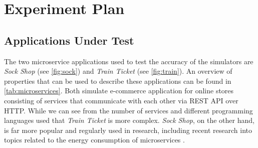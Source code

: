 \section{Experiment Plan}
\subsection{Applications Under Test} \label{sec:apps}
The two microservice applications used to test the accuracy of the simulators are \textit{Sock Shop} \cite{weaveworks_sock_2025} (see \autoref{fig:sock}) and \textit{Train Ticket} \cite{codewisdom_train_2025} (see \autoref{fig:train}). An overview of properties that can be used to describe these applications can be found in \autoref{tab:microservices}. Both simulate e-commerce application for online stores consisting of services that communicate with each other via REST API over HTTP. While we can see from the number of services and different programming languages used that \textit{Train Ticket} is more complex. \textit{Sock Shop}, on the other hand, is far more popular and regularly used in research, including recent research into topics related to the energy consumption of microservices \cite{floroiu_anomaly_2024, rao_energy-aware_2025}.  

